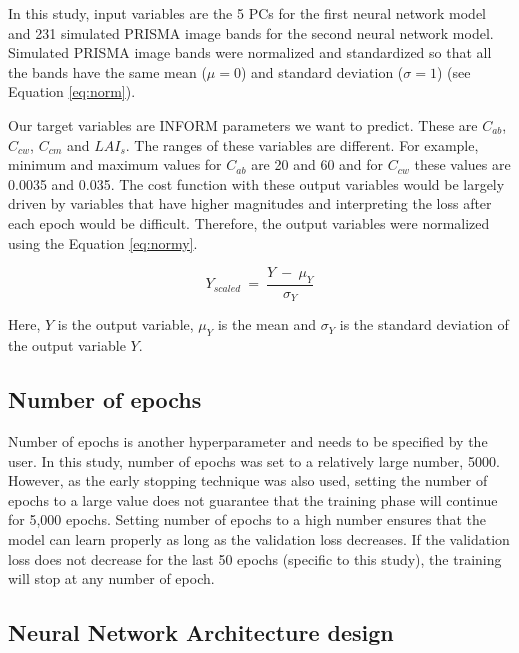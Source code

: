 \documentclass[a4paper, twoside]{templates/ociamthesis}
\begin{document}
In this study, input variables are the 5 PCs for the first neural network model and 231 simulated PRISMA image bands for the second neural network model. Simulated PRISMA image bands were normalized and standardized so that all the bands have the same mean (\(\mu = 0\)) and standard deviation (\(\sigma = 1\)) (see Equation \eqref{eq:norm}).

Our target variables are INFORM parameters we want to predict. These are \(C_{ab}\), \(C_{cw}\), \(C_{cm}\) and \(LAI_{s}\). The ranges of these variables are different. For example, minimum and maximum values for \(C_{ab}\) are 20 and 60 and for \(C_{cw}\) these values are 0.0035 and 0.035. The cost function with these output variables would be largely driven by variables that have higher magnitudes and interpreting the loss after each epoch would be difficult. Therefore, the output variables were normalized using the Equation \eqref{eq:normy}.

\begin{equation}
Y_{scaled}\ =\ \frac{Y\ -\ \mu_{Y}}{\sigma_{Y}}
\label{eq:normy}
\end{equation}

Here, \(Y\) is the output variable, \(\mu_{Y}\) is the mean and \(\sigma_{Y}\) is the standard deviation of the output variable \(Y\).

\hypertarget{number-of-epochs}{%
\subsection{Number of epochs}\label{number-of-epochs}}

Number of epochs is another hyperparameter and needs to be specified by the user. In this study, number of epochs was set to a relatively large number, 5000. However, as the early stopping technique was also used, setting the number of epochs to a large value does not guarantee that the training phase will continue for 5,000 epochs. Setting number of epochs to a high number ensures that the model can learn properly as long as the validation loss decreases. If the validation loss does not decrease for the last 50 epochs (specific to this study), the training will stop at any number of epoch.

\hypertarget{neural-network-architecture-design}{%
\subsection{Neural Network Architecture design}\label{neural-network-architecture-design}}
\end{document}
